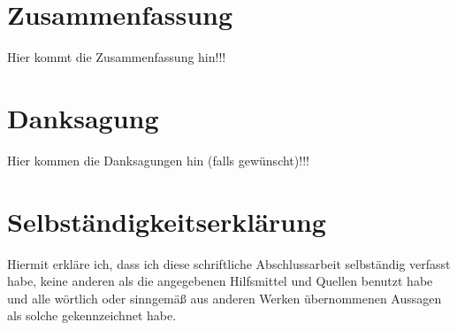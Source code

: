 \documentclass[12pt,a4paper]{report}
\begin{document}

\setcounter{page}{1}



\thispagestyle{plain}
\section*{Zusammenfassung}

Hier kommt die Zusammenfassung hin!!!
\newpage


\thispagestyle{plain}
\section*{Danksagung}

Hier kommen die Danksagungen hin (falls gewünscht)!!!

\newpage

\thispagestyle{empty}
\section*{Selbständigkeitserklärung}


Hiermit erkläre ich, dass ich diese schriftliche Abschlussarbeit selbständig verfasst habe, keine anderen als die angegebenen Hilfsmittel und Quellen benutzt habe und alle wörtlich oder sinngemäß aus anderen Werken übernommenen Aussagen als solche gekennzeichnet habe.
\end{document}
